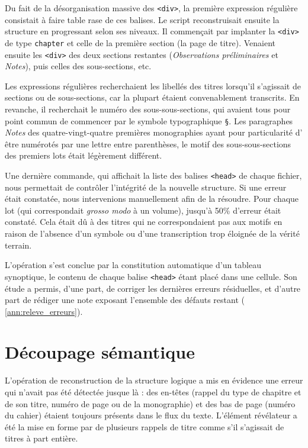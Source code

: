 Du fait de la désorganisation massive des \texttt{<div>}, la première expression régulière consistait à faire table rase de ces balises. Le script reconstruisait ensuite la structure en progressant selon ses niveaux. Il commençait par implanter la \texttt{<div>} de type \texttt{chapter} et celle de la première section (la page de titre). Venaient ensuite les \texttt{<div>} des deux sections restantes (\textit{Observations préliminaires} et \textit{Notes}), puis celles des sous-sections, etc.

Les expressions régulières recherchaient les libellés des titres lorsqu'il s'agissait de sections ou de sous-sections, car la plupart étaient convenablement transcrits. En revanche, il recherchait le numéro des sous-sous-sections, qui avaient tous pour point commun de commencer par le symbole typographique \texttt{§}. Les paragraphes \textit{Notes} des quatre-vingt-quatre premières monographies ayant pour particularité d'
être numérotés par une lettre entre parenthèses, le motif des sous-sous-sections des premiers lots était légèrement différent.

Une dernière commande, qui affichait la liste des balises \texttt{<head>} de chaque fichier, nous permettait de contrôler l'intégrité de la nouvelle structure. Si une erreur était constatée, nous intervenions manuellement afin de la résoudre. Pour chaque lot (qui correspondait \textit{grosso modo} à un volume), jusqu'à 50\% d'erreur était constaté. Cela était dû à des titres qui ne correspondaient pas aux motifs en raison de l'absence d'un symbole ou d'une transcription trop éloignée de la vérité terrain.

L'opération s'est conclue par la constitution automatique d'un tableau synoptique, le contenu de chaque balise \texttt{<head>} étant placé dans une cellule. Son étude a permis, d'une part, de corriger les dernières erreurs résiduelles, et d'autre part de rédiger une note exposant l'ensemble des défauts restant (\ann{} \ref{ann:releve_erreurs}).

\section{Découpage sémantique}

L'opération de reconstruction de la structure logique a mis en évidence une erreur qui n'avait pas été détectée jusque là : des en-têtes (rappel du type de chapitre et de son titre, numéro de page ou de la monographie) et des bas de page (numéro du cahier) étaient toujours présents dans le flux du texte. L'élément révélateur a été la mise en forme par \lse{} de plusieurs rappels de titre comme s'il s'agissait de titres à part entière. 

